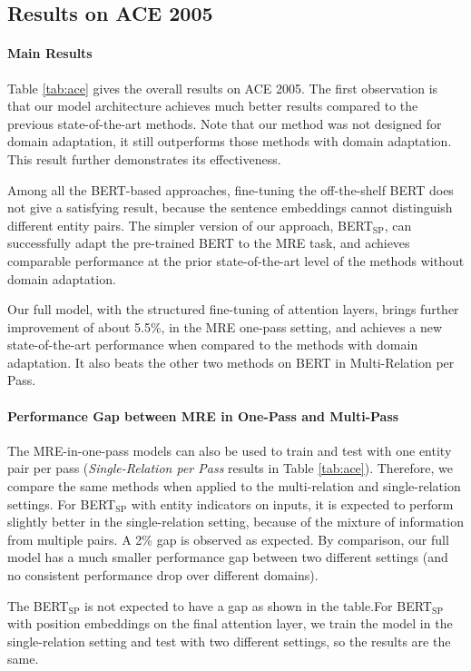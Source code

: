 \documentclass[11pt,a4paper]{article}
\begin{document}
\subsection{Results on ACE 2005}

\paragraph{Main Results}

Table \ref{tab:ace} gives the overall results on ACE 2005. The first observation is that our model architecture achieves much better results compared to the previous state-of-the-art methods. Note that our method was not designed for domain adaptation, it still outperforms those methods with domain adaptation. This result further demonstrates its effectiveness.

Among all the BERT-based approaches, fine-tuning the off-the-shelf BERT does not give a satisfying result, because the sentence embeddings cannot distinguish different entity pairs.
The simpler version of our approach, BERT$_{\textrm{SP}}$, can successfully adapt the pre-trained BERT to the MRE task, and achieves comparable performance at the prior state-of-the-art level of the methods without domain adaptation.

Our full model, with the structured fine-tuning of attention layers, brings further improvement of about 5.5\%, in the MRE one-pass setting, and achieves a new state-of-the-art performance when compared to the methods with domain adaptation. It also beats the other two methods on BERT in Multi-Relation per Pass.

\paragraph{Performance Gap between MRE in One-Pass and Multi-Pass}
The MRE-in-one-pass models can also be used to train and test with one entity pair per pass (\emph{Single-Relation per Pass} results in Table \ref{tab:ace}).
Therefore, we compare the same methods when applied to the multi-relation and single-relation settings.
For BERT$_\textrm{SP}$ with entity indicators on inputs, it is expected to perform slightly better in the single-relation setting, because of the mixture of information from multiple pairs. A 2\% gap is observed as expected. 
By comparison, our full model has a much smaller performance gap between two different settings (and no consistent performance drop over different domains).

The BERT$_\textrm{SP}$ is not expected to have a gap as shown in the table.For BERT$_\textrm{SP}$ with position embeddings on the final attention layer, we train the model in the single-relation setting and test with two different settings, so the results are the same.
\end{document}
